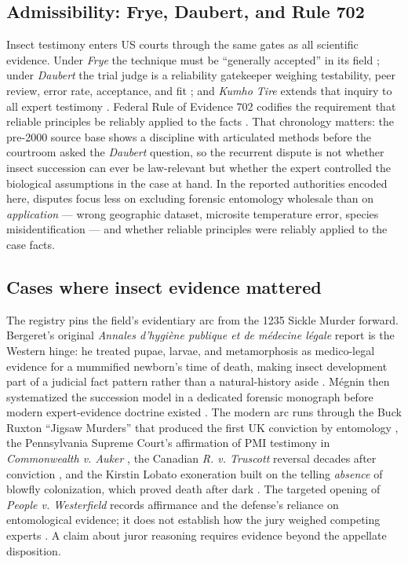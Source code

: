 \documentclass[
  english,
]{article}
\begin{document}
\subsection{Admissibility: Frye, Daubert, and Rule
702}\label{admissibility-frye-daubert-and-rule-702}

Insect testimony enters US courts through the same gates as all
scientific evidence. Under \emph{Frye} the technique must be ``generally
accepted'' in its field \citep{frye1923, cornell_frye}; under
\emph{Daubert} the trial judge is a reliability gatekeeper weighing
testability, peer review, error rate, acceptance, and fit
\citep{daubert1993}; and \emph{Kumho Tire} extends that inquiry to all
expert testimony \citep{kumho1999}. Federal Rule of Evidence 702
codifies the requirement that reliable principles be reliably applied to
the facts \citep{cornell_fre702}. That chronology matters: the pre-2000
source base shows a discipline with articulated methods before the
courtroom asked the \emph{Daubert} question, so the recurrent dispute is
not whether insect succession can ever be law-relevant but whether the
expert controlled the biological assumptions in the case at hand. In the
reported authorities encoded here, disputes focus less on excluding
forensic entomology wholesale than on \emph{application} --- wrong
geographic dataset, microsite temperature error, species
misidentification --- and whether reliable principles were reliably
applied to the case facts.

\subsection{Cases where insect evidence
mattered}\label{cases-where-insect-evidence-mattered}

The registry pins the field's evidentiary arc from the 1235 Sickle
Murder forward. Bergeret's original \emph{Annales d'hygiène publique et
de médecine légale} report is the Western hinge: he treated pupae,
larvae, and metamorphosis as medico-legal evidence for a mummified
newborn's time of death, making insect development part of a judicial
fact pattern rather than a natural-history aside
\citep{bergeret1855_infanticide}. Mégnin then systematized the
succession model in a dedicated forensic monograph before modern
expert-evidence doctrine existed \citep{megnin1894}. The modern arc runs
through the Buck Ruxton ``Jigsaw Murders'' that produced the first UK
conviction by entomology \citep{nhm_maggots}, the Pennsylvania Supreme
Court's affirmation of PMI testimony in \emph{Commonwealth v. Auker}
\citep{auker1996}, the Canadian \emph{R. v. Truscott} reversal decades
after conviction \citep{truscott2007}, and the Kirstin Lobato
exoneration built on the telling \emph{absence} of blowfly colonization,
which proved death after dark \citep{innocence_lobato}. The targeted
opening of \emph{People v. Westerfield} records affirmance and the
defense's reliance on entomological evidence; it does not establish how
the jury weighed competing experts \citep{depth_westerfield}. A claim
about juror reasoning requires evidence beyond the appellate
disposition.
\end{document}
